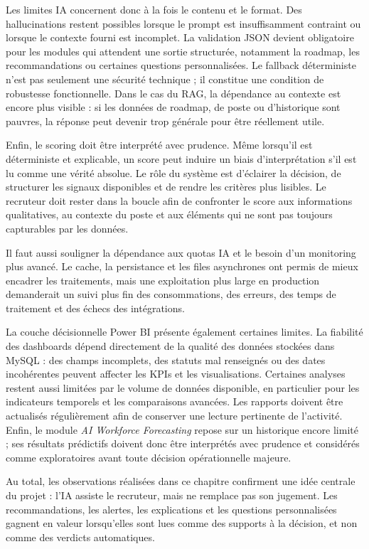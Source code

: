 Les limites IA concernent donc à la fois le contenu et le format. Des hallucinations restent possibles lorsque le prompt est insuffisamment contraint ou lorsque le contexte fourni est incomplet. La validation JSON devient obligatoire pour les modules qui attendent une sortie structurée, notamment la roadmap, les recommandations ou certaines questions personnalisées. Le fallback déterministe n'est pas seulement une sécurité technique ; il constitue une condition de robustesse fonctionnelle. Dans le cas du RAG, la dépendance au contexte est encore plus visible : si les données de roadmap, de poste ou d'historique sont pauvres, la réponse peut devenir trop générale pour être réellement utile.

Enfin, le scoring doit être interprété avec prudence. Même lorsqu'il est déterministe et explicable, un score peut induire un biais d'interprétation s'il est lu comme une vérité absolue. Le rôle du système est d'éclairer la décision, de structurer les signaux disponibles et de rendre les critères plus lisibles. Le recruteur doit rester dans la boucle afin de confronter le score aux informations qualitatives, au contexte du poste et aux éléments qui ne sont pas toujours capturables par les données.

Il faut aussi souligner la dépendance aux quotas IA et le besoin d'un monitoring plus avancé. Le cache, la persistance et les files asynchrones ont permis de mieux encadrer les traitements, mais une exploitation plus large en production demanderait un suivi plus fin des consommations, des erreurs, des temps de traitement et des échecs des intégrations.

La couche décisionnelle Power BI présente également certaines limites. La fiabilité des dashboards dépend directement de la qualité des données stockées dans MySQL : des champs incomplets, des statuts mal renseignés ou des dates incohérentes peuvent affecter les KPIs et les visualisations. Certaines analyses restent aussi limitées par le volume de données disponible, en particulier pour les indicateurs temporels et les comparaisons avancées. Les rapports doivent être actualisés régulièrement afin de conserver une lecture pertinente de l'activité. Enfin, le module \textit{AI Workforce Forecasting} repose sur un historique encore limité ; ses résultats prédictifs doivent donc être interprétés avec prudence et considérés comme exploratoires avant toute décision opérationnelle majeure.

Au total, les observations réalisées dans ce chapitre confirment une idée centrale du projet : l'IA assiste le recruteur, mais ne remplace pas son jugement. Les recommandations, les alertes, les explications et les questions personnalisées gagnent en valeur lorsqu'elles sont lues comme des supports à la décision, et non comme des verdicts automatiques.

